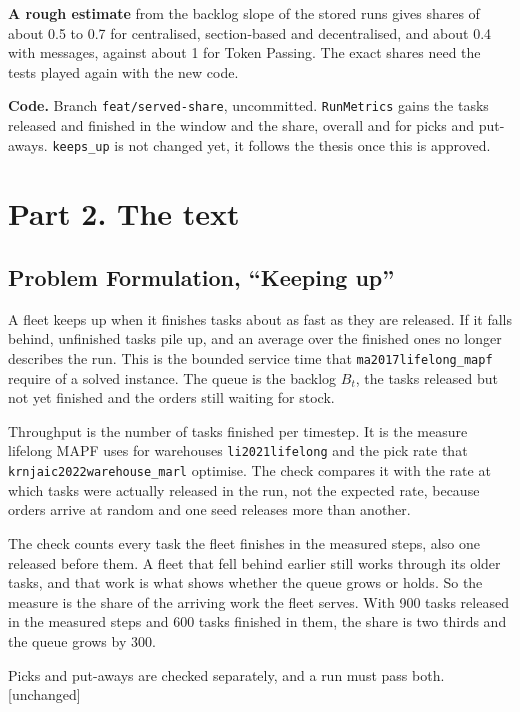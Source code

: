 \documentclass[11pt,a4paper]{article}
\newcommand{\new}[1]{\textcolor{newc}{#1}}
\begin{document}
\textbf{A rough estimate} from the backlog slope of the stored runs gives shares of about 0.5 to 0.7
for centralised, section-based and decentralised, and about 0.4 with messages, against about 1 for
Token Passing. The exact shares need the tests played again with the new code.

\textbf{Code.} Branch \texttt{feat/served-share}, uncommitted. \texttt{RunMetrics} gains the tasks
released and finished in the window and the share, overall and for picks and put-aways.
\texttt{keeps\_up} is not changed yet, it follows the thesis once this is approved.

\section*{Part 2. The text}

\subsection*{Problem Formulation, ``Keeping up''}

A fleet keeps up when it finishes tasks about as fast as they are released. If it falls behind,
unfinished tasks pile up, and an average over the finished ones no longer describes the run. This is
the bounded service time that \texttt{ma2017lifelong\_mapf} require of a solved instance. The queue is
the backlog $B_t$, the tasks released but not yet finished and the orders still waiting for stock.

Throughput is the number of tasks finished per timestep. It is the measure lifelong MAPF uses for
warehouses \texttt{li2021lifelong} and the pick rate that \texttt{krnjaic2022warehouse\_marl} optimise.
The check compares it with the rate at which tasks were actually released in the run, not the expected
rate, because orders arrive at random and one seed releases more than another.

\new{The check counts every task the fleet finishes in the measured steps, also one released before
them. A fleet that fell behind earlier still works through its older tasks, and that work is what
shows whether the queue grows or holds. So the measure is the share of the arriving work the fleet
serves. With 900 tasks released in the measured steps and 600 tasks finished in them, the share is
two thirds and the queue grows by 300.}

Picks and put-aways are checked separately, and a run must pass both. [unchanged]
\end{document}
